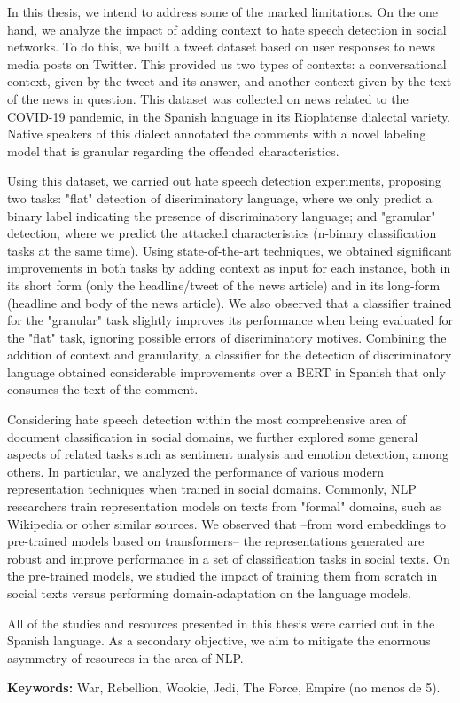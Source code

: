 In this thesis, we intend to address some of the marked limitations. On the one hand, we analyze the impact of adding context to hate speech detection in social networks. To do this, we built a tweet dataset based on user responses to news media posts on Twitter. This provided us two types of contexts: a conversational context, given by the tweet and its answer, and another context given by the text of the news in question. This dataset was collected on news related to the COVID-19 pandemic, in the Spanish language in its Rioplatense dialectal variety. Native speakers of this dialect annotated the comments with a novel labeling model that is granular regarding the offended characteristics.

Using this dataset, we carried out hate speech detection experiments, proposing two tasks: "flat" detection of discriminatory language, where we only predict a binary label indicating the presence of discriminatory language; and "granular" detection, where we predict the attacked characteristics (n-binary classification tasks at the same time). Using state-of-the-art techniques, we obtained significant improvements in both tasks by adding context as input for each instance, both in its short form (only the headline/tweet of the news article) and in its long-form (headline and body of the news article). We also observed that a classifier trained for the "granular" task slightly improves its performance when being evaluated for the "flat" task, ignoring possible errors of discriminatory motives. Combining the addition of context and granularity, a classifier for the detection of discriminatory language obtained considerable improvements over a BERT in Spanish that only consumes the text of the comment.

Considering hate speech detection within the most comprehensive area of ​​document classification in social domains, we further explored  some general aspects of related tasks such as sentiment analysis and emotion detection, among others. In particular, we analyzed the performance of various modern representation techniques when trained in social domains. Commonly, NLP researchers train representation models on texts from "formal" domains, such as Wikipedia or other similar sources. We observed that –from word embeddings to pre-trained models based on transformers– the representations generated are robust and improve performance in a set of classification tasks in social texts. On the pre-trained models, we studied the impact of training them from scratch in social texts versus performing domain-adaptation on the language models.

All of the studies and resources presented in this thesis were carried out in the Spanish language. As a secondary objective, we aim to mitigate the enormous asymmetry of resources in the area of NLP.

\bigskip

\noindent\textbf{Keywords:} War, Rebellion, Wookie, Jedi, The Force, Empire (no menos de 5).